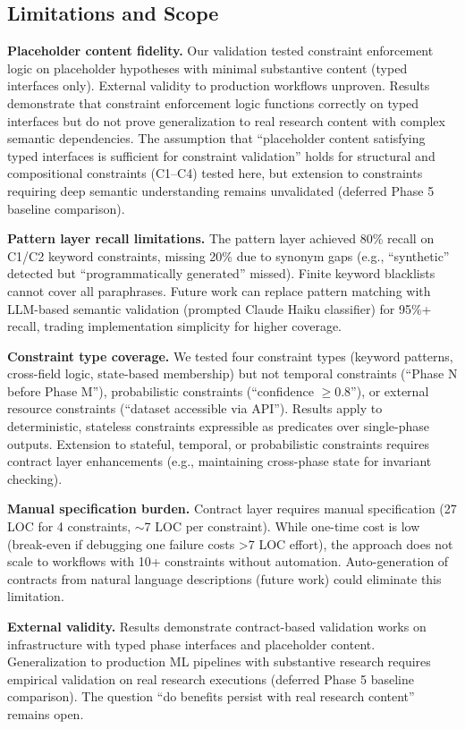 \subsection{Limitations and Scope}

\textbf{Placeholder content fidelity.} Our validation tested constraint enforcement logic on placeholder hypotheses with minimal substantive content (typed interfaces only). External validity to production workflows unproven. Results demonstrate that constraint enforcement logic functions correctly on typed interfaces but do not prove generalization to real research content with complex semantic dependencies. The assumption that ``placeholder content satisfying typed interfaces is sufficient for constraint validation'' holds for structural and compositional constraints (C1--C4) tested here, but extension to constraints requiring deep semantic understanding remains unvalidated (deferred Phase 5 baseline comparison).

\textbf{Pattern layer recall limitations.} The pattern layer achieved 80\% recall on C1/C2 keyword constraints, missing 20\% due to synonym gaps (e.g., ``synthetic'' detected but ``programmatically generated'' missed). Finite keyword blacklists cannot cover all paraphrases. Future work can replace pattern matching with LLM-based semantic validation (prompted Claude Haiku classifier) for 95\%+ recall, trading implementation simplicity for higher coverage.

\textbf{Constraint type coverage.} We tested four constraint types (keyword patterns, cross-field logic, state-based membership) but not temporal constraints (``Phase N before Phase M''), probabilistic constraints (``confidence $\geq$0.8''), or external resource constraints (``dataset accessible via API''). Results apply to deterministic, stateless constraints expressible as predicates over single-phase outputs. Extension to stateful, temporal, or probabilistic constraints requires contract layer enhancements (e.g., maintaining cross-phase state for invariant checking).

\textbf{Manual specification burden.} Contract layer requires manual specification (27 LOC for 4 constraints, $\sim$7 LOC per constraint). While one-time cost is low (break-even if debugging one failure costs >7 LOC effort), the approach does not scale to workflows with 10+ constraints without automation. Auto-generation of contracts from natural language descriptions (future work) could eliminate this limitation.

\textbf{External validity.} Results demonstrate contract-based validation works on infrastructure with typed phase interfaces and placeholder content. Generalization to production ML pipelines with substantive research requires empirical validation on real research executions (deferred Phase 5 baseline comparison). The question ``do benefits persist with real research content'' remains open.

